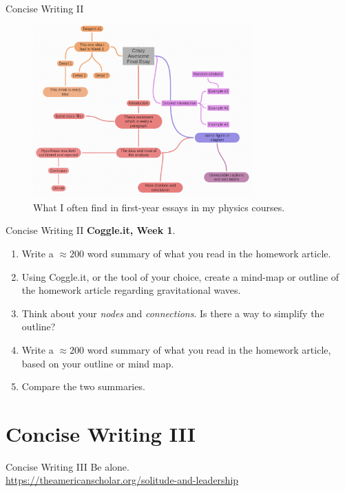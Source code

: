 \documentclass{beamer}
\begin{document}
\begin{frame}{Concise Writing II}
\begin{figure}
\centering
\includegraphics[width=0.75\textwidth]{figures/MindMap3.png}
\caption{\label{fig:mm3} What I often find in first-year essays in my physics courses.}
\end{figure}
\end{frame}

\begin{frame}{Concise Writing II}
\textbf{Coggle.it, Week 1}.
\begin{enumerate}
\item Write a $\approx 200$ word summary of what you read in the homework article.
\item Using Coggle.it, or the tool of your choice, create a mind-map or outline of the homework article regarding gravitational waves.
\item Think about your \textit{nodes} and \textit{connections}.  Is there a way to simplify the outline?
\item Write a $\approx 200$ word summary of what you read in the homework article, based on your outline or mind map.
\item Compare the two summaries.
\end{enumerate}
\end{frame}

\section{Concise Writing III}

\begin{frame}{Concise Writing III}
\small
Be alone. \\ \vspace{0.5cm}
\url{https://theamericanscholar.org/solitude-and-leadership}
\end{frame}
\end{document}
